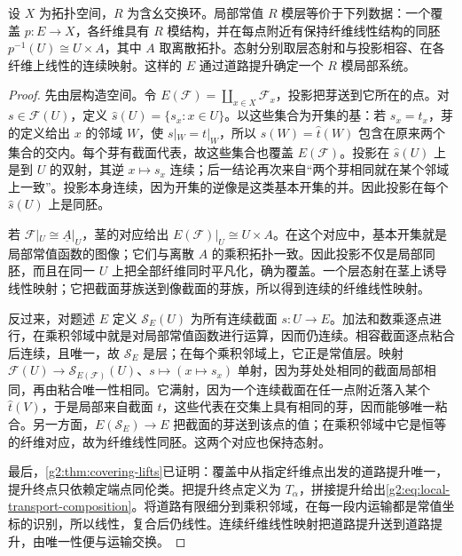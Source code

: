 \begin{proposition}\label{g2:prop:local-sheaf-fiber-space}
	设 \(X\) 为拓扑空间，\(R\) 为含幺交换环。局部常值 \(R\) 模层等价于下列数据：一个覆盖 \(p:E\to X\)，各纤维具有 \(R\) 模结构，并在每点附近有保持纤维线性结构的同胚 \(p^{-1}(U)\cong U\times A\)，其中 \(A\) 取离散拓扑。态射分别取层态射和与投影相容、在各纤维上线性的连续映射。这样的 \(E\) 通过道路提升确定一个 \(R\) 模局部系统。
\end{proposition}
\begin{proof}
	先由层构造空间。令 \(E(\mathscr F)=\coprod_{x\in X}\mathscr F_x\)，投影把芽送到它所在的点。对 \(s\in\mathscr F(U)\)，定义 \(\widehat s(U)=\{s_x:x\in U\}\)。以这些集合为开集的基：若 \(s_x=t_x\)，芽的定义给出 \(x\) 的邻域 \(W\)，使 \(s|_W=t|_W\)，所以 \(\widehat s(W)=\widehat t(W)\) 包含在原来两个集合的交内。每个芽有截面代表，故这些集合也覆盖 \(E(\mathscr F)\)。投影在 \(\widehat s(U)\) 上是到 \(U\) 的双射，其逆 \(x\mapsto s_x\) 连续；后一结论再次来自“两个芽相同就在某个邻域上一致”。投影本身连续，因为开集的逆像是这类基本开集的并。因此投影在每个 \(\widehat s(U)\) 上是同胚。

	若 \(\mathscr F|_U\cong\underline A|_U\)，茎的对应给出 \(E(\mathscr F)|_U\cong U\times A\)。在这个对应中，基本开集就是局部常值函数的图像；它们与离散 \(A\) 的乘积拓扑一致。因此投影不仅是局部同胚，而且在同一 \(U\) 上把全部纤维同时平凡化，确为覆盖。一个层态射在茎上诱导线性映射；它把截面芽族送到像截面的芽族，所以得到连续的纤维线性映射。

	反过来，对题述 \(E\) 定义 \(\mathscr S_E(U)\) 为所有连续截面 \(s:U\to E\)。加法和数乘逐点进行，在乘积邻域中就是对局部常值函数进行运算，因而仍连续。相容截面逐点粘合后连续，且唯一，故 \(\mathscr S_E\) 是层；在每个乘积邻域上，它正是常值层。映射 \(\mathscr F(U)\to\mathscr S_{E(\mathscr F)}(U)\)、\(s\mapsto(x\mapsto s_x)\) 单射，因为芽处处相同的截面局部相同，再由粘合唯一性相同。它满射，因为一个连续截面在任一点附近落入某个 \(\widehat t(V)\)，于是局部来自截面 \(t\)，这些代表在交集上具有相同的芽，因而能够唯一粘合。另一方面，\(E(\mathscr S_E)\to E\) 把截面的芽送到该点的值；在乘积邻域中它是恒等的纤维对应，故为纤维线性同胚。这两个对应也保持态射。

	最后，\cref{g2:thm:covering-lifts}已证明：覆盖中从指定纤维点出发的道路提升唯一，提升终点只依赖定端点同伦类。把提升终点定义为 \(T_\alpha\)，拼接提升给出\eqref{g2:eq:local-transport-composition}。将道路有限细分到乘积邻域，在每一段内运输都是常值坐标的识别，所以线性，复合后仍线性。连续纤维线性映射把道路提升送到道路提升，由唯一性便与运输交换。
\end{proof}

